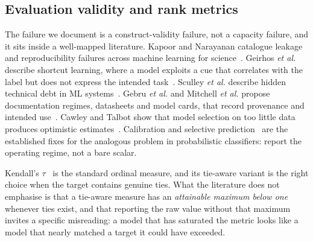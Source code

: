 \documentclass[journal,10pt]{IEEEtran}
\begin{document}
\subsection{Evaluation validity and rank metrics}

The failure we document is a construct-validity failure, not a capacity failure, and it sits inside
a well-mapped literature. Kapoor and Narayanan catalogue leakage and reproducibility failures
across machine learning for science~\cite{kapoor2023}. Geirhos \emph{et al.} describe shortcut
learning, where a model exploits a cue that correlates with the label but does not express the
intended task~\cite{geirhos2020}. Sculley \emph{et al.} describe hidden technical debt in ML
systems~\cite{sculley2015}. Gebru \emph{et al.} and Mitchell \emph{et al.} propose documentation
regimes, datasheets and model cards, that record provenance and intended use~\cite{gebru2021,mitchell2019}.
Cawley and Talbot show that model selection on too little data produces optimistic
estimates~\cite{cawley2010}. Calibration and selective prediction~\cite{guo2017,geifman2017} are the
established fixes for the analogous problem in probabilistic classifiers: report the operating
regime, not a bare scalar.

Kendall's $\tau$~\cite{kendall1938} is the standard ordinal measure, and its tie-aware variant is
the right choice when the target contains genuine ties. What the literature does not emphasise is
that a tie-aware measure has an \emph{attainable maximum below one} whenever ties exist, and that
reporting the raw value without that maximum invites a specific misreading: a model that has
saturated the metric looks like a model that nearly matched a target it could have exceeded.
\end{document}
